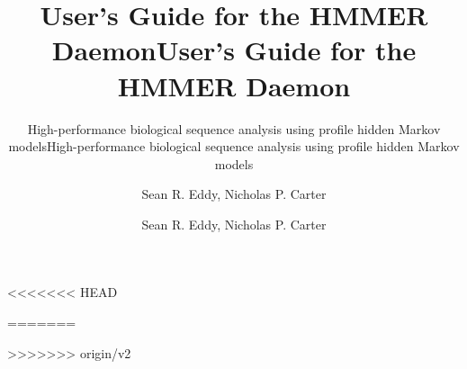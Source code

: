 <<<<<<< HEAD
\title{User's Guide for the HMMER Daemon}

\subtitle{High-performance biological sequence analysis using profile hidden Markov models}

\author{Sean R. Eddy, Nicholas P. Carter}


=======
\title{User's Guide for the HMMER Daemon}

\subtitle{High-performance biological sequence analysis using profile hidden Markov models}

\author{Sean R. Eddy, Nicholas P. Carter}


>>>>>>> origin/v2
